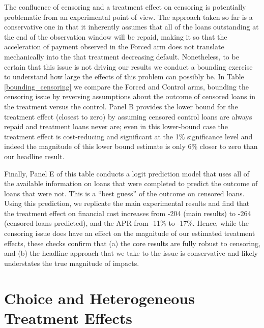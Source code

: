 \documentclass[11pt, a4paper]{article}
\begin{document}
The confluence of censoring and a treatment effect on censoring is potentially problematic from an experimental point of view.  The approach taken so far is a conservative one in that it inherently assumes that all of the loans outstanding at the end of the observation window will be repaid, making it so that the acceleration of payment observed in the Forced arm does not translate mechanically into the that treatment decreasing default.  Nonetheless, to be certain that this issue is not driving our results we conduct a bounding exercise to understand how large the effects of this problem can possibly be.  In Table \ref{bounding_censoring} we compare the Forced and Control arms, bounding the censoring issue by reversing assumptions about the outcome of censored loans in the treatment versus the control.   Panel B provides the lower bound for the treatment effect (closest to zero) by assuming censored control loans are always repaid and treatment loans never are; even in this lower-bound case the treatment effect is cost-reducing and significant at the 1\% significance level and indeed the magnitude of this lower bound estimate is only 6\% closer to zero than our headline result.   

Finally, Panel E of this table conducts a logit prediction model that uses all of the available information on loans that were completed to predict the outcome of loans that were not.  This is a ``best guess'' of the outcome on censored loans.  Using this prediction, we replicate the main experimental results and find that the treatment effect on financial cost increases from -204 (main results) to -264 (censored loans predicted), and the APR from -11\% to -17\%.  Hence, while the censoring issue does have an effect on the magnitude of our estimated treatment effects, these  checks confirm that (a) the core results are fully robust to censoring, and (b) the headline approach that we take to the issue is conservative and likely understates the true magnitude of impacts.

\section{Choice and Heterogeneous Treatment Effects}
\label{Choice}
\end{document}
